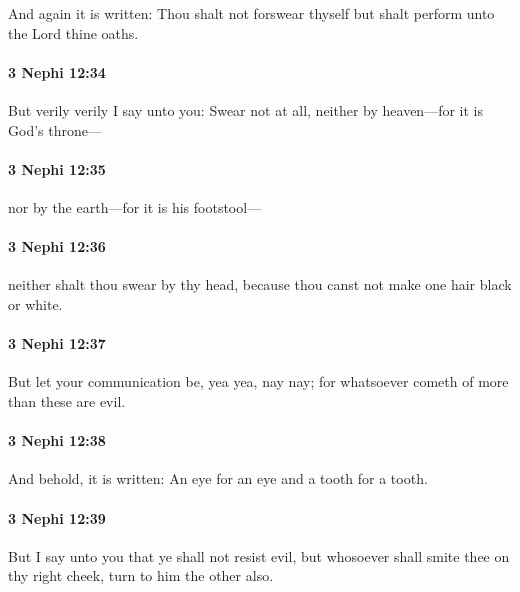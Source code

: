 			And again it is written:
			Thou shalt not forswear thyself
			but shalt perform unto the Lord thine oaths.

		\paragraph{3 Nephi 12:34} %
			\label{3NEPHI-12-34}

			But verily verily I say unto you:
			Swear not at all,
			neither by heaven---for it is God's throne---

		\paragraph{3 Nephi 12:35} %
			\label{3NEPHI-12-35}

			nor by the earth---for it is his footstool---

		\paragraph{3 Nephi 12:36} %
			\label{3NEPHI-12-36}

			neither shalt thou swear by thy head,
			because thou canst not make one hair black or white.

		\paragraph{3 Nephi 12:37} %
			\label{3NEPHI-12-37}

			But let your communication be, yea yea, nay nay;
			for whatsoever cometh of more than these are evil.

		\paragraph{3 Nephi 12:38} %
			\label{3NEPHI-12-38}

			And behold, it is written:
			An eye for an eye and a tooth for a tooth.

		\paragraph{3 Nephi 12:39} %
			\label{3NEPHI-12-39}

			But I say unto you that ye shall not resist evil,
			but whosoever shall smite thee on thy right cheek,
			turn to him the other also.

